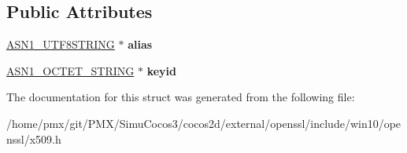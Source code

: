 \subsection*{Public Attributes}
\begin{DoxyCompactItemize}
\item 
\mbox{\label{structx509__cert__aux__st_a1a7eaa5e4a497f4b697d4709e5117d5b}} 
\hyperlink{structasn1__string__st}{A\+S\+N1\+\_\+\+U\+T\+F8\+S\+T\+R\+I\+NG} $\ast$ {\bfseries alias}
\item 
\mbox{\label{structx509__cert__aux__st_a6f0743e8b9131e4502d55ca83d278801}} 
\hyperlink{structasn1__string__st}{A\+S\+N1\+\_\+\+O\+C\+T\+E\+T\+\_\+\+S\+T\+R\+I\+NG} $\ast$ {\bfseries keyid}
\end{DoxyCompactItemize}


The documentation for this struct was generated from the following file\+:\begin{DoxyCompactItemize}
\item 
/home/pmx/git/\+P\+M\+X/\+Simu\+Cocos3/cocos2d/external/openssl/include/win10/openssl/x509.\+h\end{DoxyCompactItemize}
